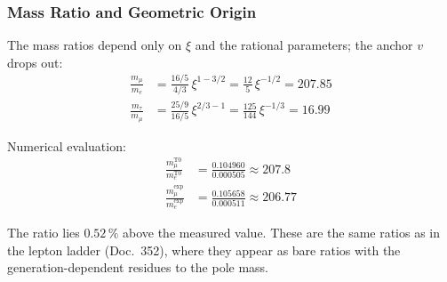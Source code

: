 	\begin{table}[h]
		\centering
		\caption{Comparison of T0 predictions with experimental values for charged leptons (values from \texttt{calc\_De.py})}
		\label{tab:lepton_comparison_direkt}
	\end{table}
	
	\subsubsection{Mass Ratio and Geometric Origin}
	
	The mass ratios depend only on $\xi$ and the rational parameters; the anchor $v$ drops out:
	\begin{align}
		\frac{m_\mu}{m_e} &= \frac{16/5}{4/3}\,\xi^{1-3/2} = \frac{12}{5}\,\xi^{-1/2} = 207.85 \\
		\frac{m_\tau}{m_\mu} &= \frac{25/9}{16/5}\,\xi^{2/3-1} = \frac{125}{144}\,\xi^{-1/3} = 16.99
	\end{align}

	Numerical evaluation:
	\begin{align}
		\frac{m_\mu^{\text{T0}}}{m_e^{\text{T0}}} &= \frac{0.104960}{0.000505} \approx 207.8 \\
		\frac{m_\mu^{\text{exp}}}{m_e^{\text{exp}}} &= \frac{0.105658}{0.000511} \approx 206.77
	\end{align}

	The ratio lies $0.52\,\%$ above the measured value. These are the same ratios as in the lepton ladder (Doc.~352), where they appear as bare ratios with the generation-dependent residues to the pole mass.

